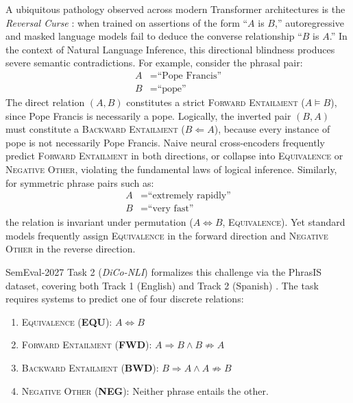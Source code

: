 \documentclass[11pt,a4paper,twocolumn]{article}
\begin{document}
A ubiquitous pathology observed across modern Transformer architectures \citep{vaswani2017attention,devlin2019bert} is the \textit{Reversal Curse} \citep{berglund2023reversal}: when trained on assertions of the form ``$A$ is $B$,'' autoregressive and masked language models fail to deduce the converse relationship ``$B$ is $A$.'' In the context of Natural Language Inference, this directional blindness produces severe semantic contradictions. For example, consider the phrasal pair:
\begin{align*}
A &= \text{``Pope Francis''} \\
B &= \text{``pope''}
\end{align*}
The direct relation $(A, B)$ constitutes a strict \textsc{Forward Entailment} ($A \models B$), since Pope Francis is necessarily a pope. Logically, the inverted pair $(B, A)$ must constitute a \textsc{Backward Entailment} ($B \Leftarrow A$), because every instance of pope is not necessarily Pope Francis. Naive neural cross-encoders frequently predict \textsc{Forward Entailment} in both directions, or collapse into \textsc{Equivalence} or \textsc{Negative Other}, violating the fundamental laws of logical inference. Similarly, for symmetric phrase pairs such as:
\begin{align*}
A &= \text{``extremely rapidly''} \\
B &= \text{``very fast''}
\end{align*}
the relation is invariant under permutation ($A \Leftrightarrow B$, \textsc{Equivalence}). Yet standard models frequently assign \textsc{Equivalence} in the forward direction and \textsc{Negative Other} in the reverse direction.

SemEval-2027 Task 2 (\textit{DiCo-NLI}) formalizes this challenge via the PhrasIS dataset, covering both Track 1 (English) and Track 2 (Spanish) \citep{lopezgazpio2027phrasis}. The task requires systems to predict one of four discrete relations:
\begin{enumerate}
    \item \textsc{Equivalence} (\textbf{EQU}): $A \Leftrightarrow B$
    \item \textsc{Forward Entailment} (\textbf{FWD}): $A \Rightarrow B \land B \not\Rightarrow A$
    \item \textsc{Backward Entailment} (\textbf{BWD}): $B \Rightarrow A \land A \not\Rightarrow B$
    \item \textsc{Negative Other} (\textbf{NEG}): Neither phrase entails the other.
\end{enumerate}
\end{document}
